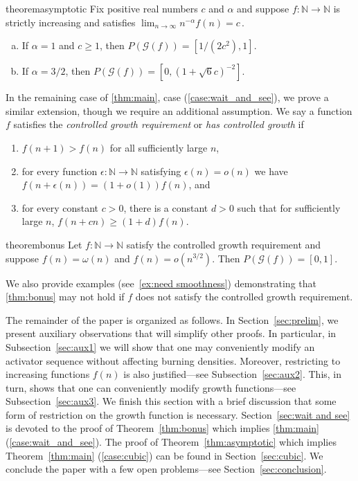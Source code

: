 \documentclass[12pt]{article}
\theoremstyle{remark}
\providecommand{\N}{}
\renewcommand{\N}{{\mathbb N}}
\newcommand\cG{\mathcal G}
\begin{document}
\begin{restatable}{theorem}{asymptotic}\label{thm:asymptotic}
Fix positive real numbers $c$ and $\alpha$ and suppose $f : \N \to \N$ is strictly increasing and satisfies $\lim_{n \to \infty} n^{-\alpha} f(n) = c \,.$
\begin{enumerate}[(a)]
\item[(a)] If $\alpha = 1$ and $c \geq 1$, then $P(\cG(f)) = [1/(2c^2),1]$. \label{case:asym_linear}
\item[(c)] If $\alpha = 3/2$, then $P(\cG(f)) = [0,(1+\sqrt{6} c)^{-2}]$. \label{case:asym_cubic}
\end{enumerate}
\end{restatable}

In the remaining case of \cref{thm:main}, case (\ref{case:wait_and_see}), we prove a similar extension, though we require an additional assumption. We say a function $f$ satisfies the \emph{controlled growth requirement} or \emph{has controlled growth} if 
\begin{enumerate}
\item[i)] $f(n+1)>f(n)$ for all sufficiently large $n$, 
\item[ii)] for every function $\epsilon: \N \to \N$ satisfying $\epsilon(n) = o(n)$ we have $f(n+\epsilon(n)) = (1+o(1))f(n)$, and
\item[iii)] for every constant $c > 0$, there is a constant $d > 0$ such that for sufficiently large $n$, $f(n+cn) \geq (1+d)f(n)$.
\end{enumerate}

\begin{restatable}{theorem}{bonus}\label{thm:bonus}
Let $f : \N \to \N$ satisfy the controlled growth requirement and suppose $f(n) = \omega(n)$ and $f(n) = o(n^{3/2})$. Then $P(\cG(f)) = [0,1]$. 
\end{restatable}

\noindent We also provide examples (see~\cref{ex:need smoothness}) demonstrating that \cref{thm:bonus} may not hold if $f$ does not satisfy the controlled growth requirement. 

\bigskip

The remainder of the paper is organized as follows. In Section~\ref{sec:prelim}, we present auxiliary observations that will simplify other proofs. In particular, in Subsection~\ref{sec:aux1} we will show that one may conveniently modify an activator sequence without affecting burning densities. Moreover, restricting to increasing functions $f(n)$ is also justified---see Subsection~\ref{sec:aux2}. This, in turn, shows that one can conveniently modify growth functions---see Subsection~\ref{sec:aux3}. We finish this section with a brief discussion that some form of restriction on the growth function is necessary. Section~\ref{sec:wait and see} is devoted to the proof of Theorem~\ref{thm:bonus} which implies \cref{thm:main} (\ref{case:wait_and_see}). The proof of Theorem~\ref{thm:asymptotic} which implies  Theorem~\ref{thm:main} (\ref{case:cubic}) can be found in Section~\ref{sec:cubic}. We conclude the paper with a few open problems---see Section~\ref{sec:conclusion}.
\end{document}
